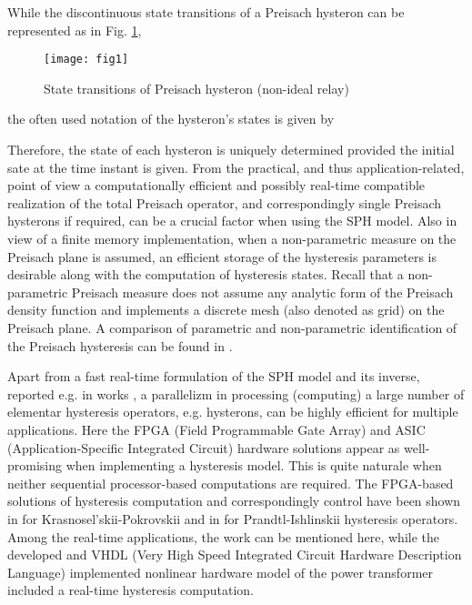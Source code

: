 \documentclass[journal]{IEEEtran}
\begin{document}
While the discontinuous state transitions of a Preisach hysteron
can be represented as in Fig. \ref{fig:1},
\begin{figure}[!h]
\centering
\texttt{[image: fig1]}
\caption{State transitions of Preisach hysteron (non-ideal relay)}
\label{fig:1}
\end{figure}
the often used notation of the hysteron's states is given by

Therefore, the state of each hysteron is uniquely determined
provided the initial sate at the time instant  is given.
From the practical, and thus application-related, point of view a
computationally efficient and possibly real-time compatible
realization of the total Preisach operator, and correspondingly
single Preisach hysterons if required, can be a crucial factor
when using the SPH model. Also in view of a finite memory
implementation, when a non-parametric measure on the Preisach
plane is assumed, an efficient storage of the hysteresis
parameters is desirable along with the computation of hysteresis
states. Recall that a non-parametric Preisach measure does not
assume any analytic form of the Preisach density function and
implements a discrete mesh (also denoted as grid) on the Preisach
plane. A comparison of parametric and non-parametric
identification of the Preisach hysteresis can be found in
\cite{HenzRuck02}.

Apart from a fast real-time formulation of the SPH model and its
inverse, reported e.g. in works
\cite{davino2005,davino2008,davino2014}, a parallelizm in
processing (computing) a large number of elementar hysteresis
operators, e.g. hysterons, can be highly efficient for multiple
applications. Here the FPGA (Field Programmable Gate Array) and
ASIC (Application-Specific Integrated Circuit) hardware solutions
appear as well-promising when implementing a hysteresis model.
This is quite naturale when neither sequential processor-based
computations are required. The FPGA-based solutions of hysteresis
computation and correspondingly control have been shown in
\cite{tan2008,iyer2009} for Krasnosel'skii-Pokrovskii and in
\cite{Janocha2008} for Prandtl-Ishlinskii hysteresis operators.
Among the real-time applications, the work \cite{Liu2014} can be
mentioned here, while the developed and VHDL (Very High Speed
Integrated Circuit Hardware Description Language) implemented
nonlinear hardware model of the power transformer included a
real-time hysteresis computation.
\end{document}

